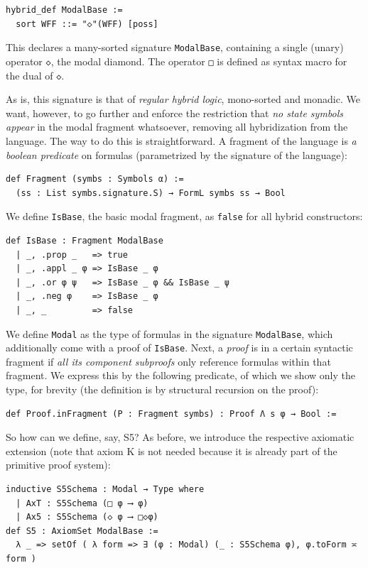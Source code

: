 \documentclass{easychair}
\theoremstyle{remark}
\begin{document}
\begin{lstlisting}
hybrid_def ModalBase :=
  sort WFF ::= "◇"(WFF) [poss]
\end{lstlisting}

This declares a many-sorted signature \lstinline{ModalBase}, containing a single (unary) operator \lstinline{◇}, the modal diamond. The operator \lstinline{□} is defined as syntax macro for the dual of \lstinline{◇}.

As is, this signature is that of \textit{regular hybrid logic}, mono-sorted and monadic. We want, however, to go further and enforce the restriction that \textit{no state symbols appear} in the modal fragment whatsoever, removing all hybridization from the language.
The way to do this is straightforward. A fragment of the language is \textit{a boolean predicate} on formulas (parametrized by the signature of the language):

\begin{lstlisting}
def Fragment (symbs : Symbols α) :=
  (ss : List symbs.signature.S) → FormL symbs ss → Bool
\end{lstlisting}

We define \lstinline{IsBase}, the basic modal fragment, as \lstinline{false} for all hybrid constructors:
\begin{lstlisting}
def IsBase : Fragment ModalBase
  | _, .prop _   => true
  | _, .appl _ φ => IsBase _ φ
  | _, .or φ ψ   => IsBase _ φ && IsBase _ ψ
  | _, .neg φ    => IsBase _ φ
  | _, _         => false
\end{lstlisting}

We define \lstinline{Modal} as the type of formulas in the signature \lstinline{ModalBase}, which additionally come with a proof of \lstinline{IsBase}. Next, a \textit{proof} is in a certain syntactic fragment if \textit{all its component subproofs} only reference formulas within that fragment. We express this by the following predicate, of which we show only the type, for brevity (the definition is by structural recursion on the proof):

\begin{lstlisting}
def Proof.inFragment (P : Fragment symbs) : Proof Λ s φ → Bool :=
\end{lstlisting}

So how can we define, say, S5? As before, we introduce the respective axiomatic extension (note that axiom K is not needed because it is already part of the primitive proof system):

\begin{lstlisting}
inductive S5Schema : Modal → Type where
  | AxT : S5Schema (□ φ ⟶ φ)
  | Ax5 : S5Schema (◇ φ ⟶ □◇φ)
def S5 : AxiomSet ModalBase :=
  λ _ => setOf ( λ form => ∃ (φ : Modal) (_ : S5Schema φ), φ.toForm ≍ form )
\end{lstlisting}
\end{document}

